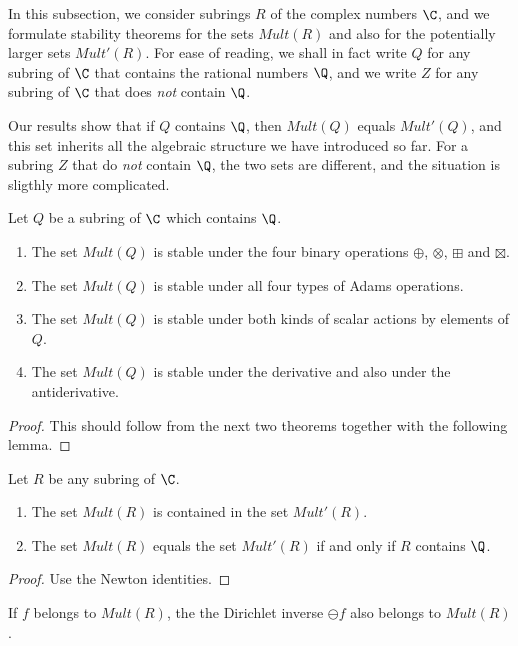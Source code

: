 \documentclass[a4paper]{article}
\begin{document}
In this subsection, we consider subrings $R$ of the complex numbers $\C$, and we formulate stability theorems for the sets $Mult(R)$ and also for the potentially larger sets $Mult'(R)$. For ease of reading, we shall in fact write $Q$ for any subring of $\C$ that contains the rational numbers $\Q$, and we write $Z$ for any subring of $\C$ that does \emph{not} contain $\Q$. 

Our results show that if $Q$ contains $\Q$, then $Mult(Q)$ equals $Mult'(Q)$, and this set inherits all the algebraic structure we have introduced so far. For a subring $Z$ that do \emph{not} contain $\Q$, the two sets are different, and the situation is sligthly more complicated.



\begin{theorem}
Let $Q$ be a subring of $\C$ which contains $\Q$. 
\begin{enumerate}
\item The set $Mult(Q)$ is stable under the four binary operations $\oplus$, $\otimes$, $\boxplus$ and $\boxtimes$.
\item The set $Mult(Q)$ is stable under all four types of Adams operations. 
\item The set $Mult(Q)$ is stable under both kinds of scalar actions by elements of $Q$.
\item The set $Mult(Q)$ is stable under the derivative and also under the antiderivative.
\end{enumerate}
\end{theorem}

\begin{proof}
This should follow from the next two theorems together with the following lemma. 
\end{proof}

\begin{lemma}
Let $R$ be any subring of $\C$. 
\begin{enumerate}
\item The set $Mult(R)$ is contained in the set $Mult'(R)$.
\item The set $Mult(R)$ equals the set $Mult'(R)$ if and only if $R$ contains $\Q$.
\end{enumerate}
\end{lemma}
\begin{proof}
Use the Newton identities.
\end{proof}

\begin{lemma}
If $f$ belongs to $Mult(R)$, the the Dirichlet inverse $\ominus f$ also belongs to $Mult(R)$. 
\end{lemma}
\end{document}
